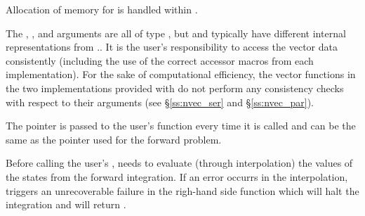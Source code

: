 {
  Allocation of memory for  is handled within {\cvodes}.

  The , , and  arguments are all 
  of type , but  and  typically have 
  different internal representations from .. It is the user's 
  responsibility to access the vector data consistently (including the use of the 
  correct accessor macros from each {\nvector} implementation). For the sake of 
  computational efficiency, the vector functions in the two {\nvector} implementations 
  provided with {\cvodes} do not perform any consistency checks with respect to their 
   arguments (see \S\ref{ss:nvec_ser} and \S\ref{ss:nvec_par}).

  The  pointer is passed to 
  the user's  function every time it is called and can be the same as the 
   pointer used for the forward problem.

  {\warn}Before calling the user's , {\cvodea} needs to evaluate
  (through interpolation) the values of the states from the forward integration. 
  If an error occurrs in the interpolation, {\cvodea} triggers an unrecoverable
  failure in the righ-hand side function which will halt the integration and
   will return .
}


